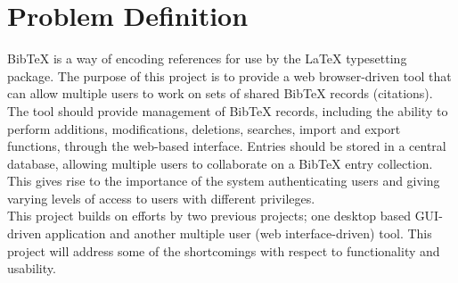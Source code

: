 \section*{Problem Definition}
BibTeX is a way of encoding references for use by the LaTeX typesetting package. The purpose of this project is to provide a web browser-driven tool that can allow multiple users to work on sets of shared BibTeX records (citations). \\

The tool should provide management of BibTeX records, including the ability to perform additions, modifications, deletions, searches, import and export functions, through the web-based interface.  Entries should be stored in a central database, allowing multiple users to collaborate on a BibTeX entry collection.  This gives rise to the importance of the system authenticating users and giving varying levels of access to users with different privileges. \\

This project builds on efforts by two previous projects; one desktop based GUI-driven application and another multiple user (web interface-driven) tool.  This project will address some of the shortcomings with respect to functionality and usability. \\

